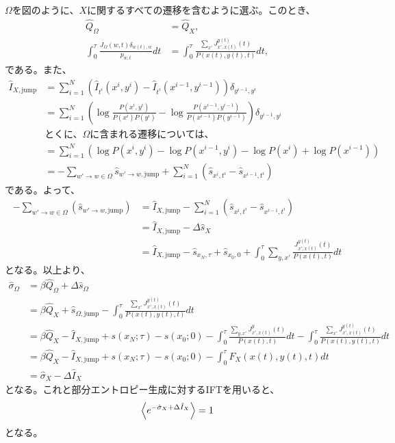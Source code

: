 \documentclass[a4paper,11pt]{jsarticle}
\numberwithin{equation}{section}
\begin{document}
$\Omega$を図のように、$X$に関するすべての遷移を含むように選ぶ。このとき、
\begin{align}
    \hat{Q}_{\Omega} &= \hat{Q}_{X}, \\
    \int_{0}^{\tau} \frac{J_{\Omega}(w,t) \delta_{w(t),w}}{p_{w,t}} dt &= \int_{0}^{\tau} \frac{\sum_{x'} J_{x',x(t)}^{y(t)}(t)}{P(x(t), y(t), t)} dt,
\end{align}
である。また、
\begin{align}
    \hat{I}_{X,\text{jump}} &= \sum_{i=1}^{N} \left(\hat{I}_{t^i}(x^{i}, y^{i}) - \hat{I}_{t^i}(x^{i-1}, y^{i-1})\right)\delta_{y^{i-1}, y^{i}} \\
    &= \sum_{i=1}^{N} \left(\log \frac{P(x^{i}, y^{i})}{P(x^{i})P(y^{i})} - \log \frac{P(x^{i-1}, y^{i-1})}{P(x^{i-1})P(y^{i-1})}\right)\delta_{y^{i-1}, y^{i}} \\
    &\text{とくに、$\Omega$に含まれる遷移については、}\\
    &= \sum_{i=1}^{N} \left(\log P(x^{i}, y^{i}) - \log P(x^{i-1}, y^{i}) - \log P(x^{i}) + \log P(x^{i-1}) \right)\\
    &= -\sum_{w' \to w \in \Omega} \hat{s}_{w' \to w, \text{jump}} + \sum_{i=1}^{N} (\hat{s}_{x^{i}, t^i} - \hat{s}_{x^{i-1}, t^i})
\end{align}
である。よって、
\begin{align}
    -\sum_{w' \to w \in \Omega} (\hat{s}_{w' \to w, \text{jump}} ) &= \hat{I}_{X,\text{jump}} -\sum_{i=1}^{N} (\hat{s}_{x^{i}, t^i} - \hat{s}_{x^{i-1}, t^i})\\
    &= \hat{I}_{X,\text{jump}} - \Delta \hat{s}_{X}\\
    &= \hat{I}_{X,\text{jump}} - \hat{s}_{x_N, \tau} + \hat{s}_{x_0, 0} + \int_{0}^{\tau} \sum_{y,x'} \frac{J_{x',x(t)}^{y(t)}(t)}{P(x(t), t)} dt
\end{align}
となる。以上より、%
\begin{align}
    \hat{\sigma}_{\Omega} &= \beta \hat{Q}_{\Omega} + \Delta \hat{s}_{\Omega} \\
    &= \beta \hat{Q}_{X} + \hat{s}_{\Omega, \text{jump}} - \int_{0}^{\tau} \frac{\sum_{x'} J_{x',x(t)}^{y(t)}(t)}{P(x(t), y(t), t)} dt \\
    &= \beta \hat{Q}_{X} - \hat{I}_{X,\text{jump}} + s(x_{N}; \tau) - s(x_0; 0) - \int_{0}^{\tau} \frac{\sum_{y,x'} J_{x',x(t)}^{y}(t)}{P(x(t), t)} dt -\int_{0}^{\tau} \frac{\sum_{x'} J_{x',x(t)}^{y(t)}(t)}{P(x(t), y(t), t)} dt\\
    &= \beta \hat{Q}_{X} - \hat{I}_{X,\text{jump}} + s(x_{N}; \tau) - s(x_0; 0) - \int_{0}^{\tau} F_X(x(t), y(t), t) dt\\
    &= \hat{\sigma}_X - \Delta \hat{I}_X
\end{align}
となる。これと部分エントロピー生成に対するIFTを用いると、
\begin{align}
    \ev{e^{-\hat{\sigma}_X + \Delta \hat{I}_X}} = 1
\end{align}
となる。\hfill\qedsymbol\\
\end{document}
